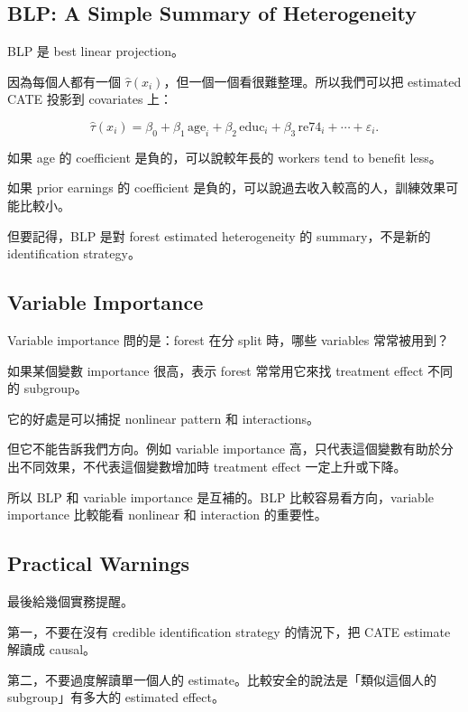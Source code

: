 \documentclass[
  chinese,
  11pt,
]{article}
\begin{document}
\subsection{BLP: A Simple Summary of
Heterogeneity}\label{blp-a-simple-summary-of-heterogeneity}

BLP 是 best linear projection。

因為每個人都有一個
\(\hat{\tau}(x_i)\)，但一個一個看很難整理。所以我們可以把 estimated CATE
投影到 covariates 上：

\[
\hat{\tau}(x_i)
=
\beta_0+\beta_1\,\text{age}_i+\beta_2\,\text{educ}_i+\beta_3\,\text{re74}_i+\cdots+\varepsilon_i.
\]

如果 age 的 coefficient 是負的，可以說較年長的 workers tend to benefit
less。

如果 prior earnings 的 coefficient
是負的，可以說過去收入較高的人，訓練效果可能比較小。

但要記得，BLP 是對 forest estimated heterogeneity 的 summary，不是新的
identification strategy。

\subsection{Variable Importance}\label{variable-importance}

Variable importance 問的是：forest 在分 split 時，哪些 variables
常常被用到？

如果某個變數 importance 很高，表示 forest 常常用它來找 treatment effect
不同的 subgroup。

它的好處是可以捕捉 nonlinear pattern 和 interactions。

但它不能告訴我們方向。例如 variable importance
高，只代表這個變數有助於分出不同效果，不代表這個變數增加時 treatment
effect 一定上升或下降。

所以 BLP 和 variable importance 是互補的。BLP 比較容易看方向，variable
importance 比較能看 nonlinear 和 interaction 的重要性。

\subsection{Practical Warnings}\label{practical-warnings}

最後給幾個實務提醒。

第一，不要在沒有 credible identification strategy 的情況下，把 CATE
estimate 解讀成 causal。

第二，不要過度解讀單一個人的 estimate。比較安全的說法是「類似這個人的
subgroup」有多大的 estimated effect。
\end{document}

